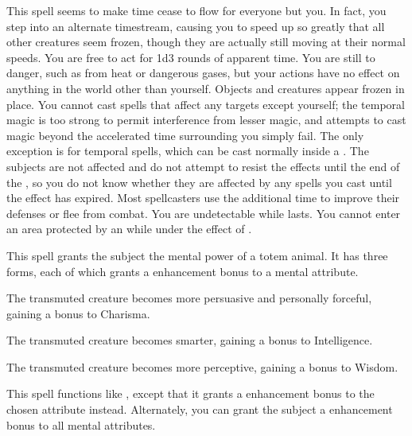 \spelleffect This spell seems to make time cease to flow for everyone but you. In fact, you step into an alternate timestream, causing you to speed up so greatly that all other creatures seem frozen, though they are actually still moving at their normal speeds. You are free to act for 1d3 rounds of apparent time. You are still \vulnerable to danger, such as from heat or dangerous gases, but your actions have no effect on anything in the world other than yourself. Objects and creatures appear frozen in place. You cannot cast spells that affect any targets except yourself; the temporal magic is too strong to permit interference from lesser magic, and attempts to cast magic beyond the accelerated time surrounding you simply fail. The only exception is for temporal spells, which can be cast normally inside a . The subjects are not affected and do not attempt to resist the effects until the end of the , so you do not know whether they are affected by any spells you cast until the effect has expired.
\spellnotes Most spellcasters use the additional time to improve their defenses or flee from combat. You are undetectable while  lasts. You cannot enter an area protected by an  while under the effect of .

\spelldur{\durshort}
\spelleffect This spell grants the subject the mental power of a totem animal. It has three forms, each of which grants a  enhancement bonus to a mental attribute.
\par {} The transmuted creature becomes more persuasive and personally forceful, gaining a bonus to Charisma.
\par {} The transmuted creature becomes smarter, gaining a bonus to Intelligence.
\par {} The transmuted creature becomes more perceptive, gaining a bonus to Wisdom.

\spelleffect This spell functions like , except that it grants a  enhancement bonus to the chosen attribute instead. Alternately, you can grant the subject a  enhancement bonus to all mental attributes.

